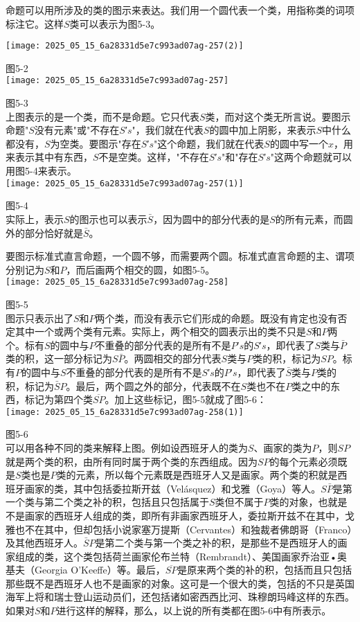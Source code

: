 命题可以用所涉及的类的图示来表达。我们用一个圆代表一个类，用指称类的词项标注它。这样$S$类可以表示为图5-3。

\texttt{[image: 2025\_05\_15\_6a28331d5e7c993ad07ag-257(2)]}

图5-2\\
\texttt{[image: 2025\_05\_15\_6a28331d5e7c993ad07ag-257]}

图5-3\\
上图表示的是一个类，而不是命题。它只代表$S$类，而对这个类无所言说。要图示命题"$S$没有元素"或"不存在$S$′$s$"，我们就在代表$S$的圆中加上阴影，来表示$S$中什么都没有，$S$为空类。要图示"存在$S$′$s$"这个命题，我们就在代表$S$的圆中写一个$x$，用来表示其中有东西，$S$不是空类。这样，"不存在$S$′$s$"和"存在$S$′$s$"这两个命题就可以用图5-4来表示。\\
\texttt{[image: 2025\_05\_15\_6a28331d5e7c993ad07ag-257(1)]}

图5-4\\
实际上，表示$S$的图示也可以表示$\bar{S}$，因为圆中的部分代表的是$S$的所有元素，而圆外的部分恰好就是$\bar{S}$。

要图示标准式直言命题，一个圆不够，而需要两个圆。标准式直言命题的主、谓项分别记为$S$和$P$，而后画两个相交的圆，如图5-5。\\
\texttt{[image: 2025\_05\_15\_6a28331d5e7c993ad07ag-258]}

图5-5\\
图示只表示出了$S$和$P$两个类，而没有表示它们形成的命题。既没有肯定也没有否定其中一个或两个类有元素。实际上，两个相交的圆表示出的类不只是$S$和$P$两个。标有$S$的圆中与$P$不重叠的部分代表的是所有不是$P$′$s$的$S$′$s$，即代表了$S$类与$\bar{P}$类的积，这一部分标记为$S\bar{P}$。两圆相交的部分代表$S$类与$P$类的积，标记为$SP$。标有$P$的圆中与$S$不重叠的部分代表的是所有不是$S$′$s$的$P$′$s$，即代表了$\bar{S}$类与$P$类的积，标记为$\bar{S}P$。最后，两个圆之外的部分，代表既不在$S$类也不在$P$类之中的东西，标记为第四个类$\overline{SP}$。加上这些标记，图5-5就成了图5-6：\\
\texttt{[image: 2025\_05\_15\_6a28331d5e7c993ad07ag-258(1)]}

图5-6\\
可以用各种不同的类来解释上图。例如设西班牙人的类为$S$、画家的类为$P$，则$SP$就是两个类的积，由所有同时属于两个类的东西组成。因为$SP$的每个元素必须既是$S$类也是$P$类的元素，所以每个元素既是西班牙人又是画家。两个类的积就是西班牙画家的类，其中包括委拉斯开兹（Velásquez）和戈雅（Goya）等人。$S\bar{P}$是第一个类与第二个类之补的积，包括且只包括属于$S$类但不属于$P$类的对象，也就是不是画家的西班牙人组成的类，即所有非画家西班牙人，委拉斯开兹不在其中，戈雅也不在其中，但却包括小说家塞万提斯（Cervantes）和独裁者佛朗哥（Franco）及其他西班牙人。$\bar{S}P$是第二个类与第一个类之补的积，是那些不是西班牙人的画家组成的类，这个类包括荷兰画家伦布兰特（Rembrandt）、美国画家乔治亚•奥基夫（Georgia O'Keeffe）等。最后，$\overline{SP}$是原来两个类的补的积，包括而且只包括那些既不是西班牙人也不是画家的对象。这可是一个很大的类，包括的不只是英国海军上将和瑞士登山运动员们，还包括诸如密西西比河、珠穆朗玛峰这样的东西。如果对$S$和$P$进行这样的解释，那么，以上说的所有类都在图5-6中有所表示。

